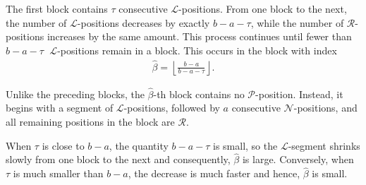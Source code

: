 \documentclass[oneside,reqno]{amsart}
\newcommand{\ts}{\mathcal{T}}
\newcommand{\lp}{\mathscr{L}}
\newcommand{\rp}{\mathscr{R}}
\newcommand{\np}{\mathscr{N}}
\newcommand{\pp}{\mathscr{P}}
\newcommand{\hbeta}{\widehat\beta}
\begin{document}
The first block contains $\tau$ consecutive $\lp$-positions. From one block to the next, the number of $\lp$-positions decreases by exactly $b-a-\tau$, while the number of $\rp$-positions increases by the same amount. %
This process continues until fewer than $b-a-\tau$  $\;\lp$-positions remain in a block. This occurs in the block with index
 \begin{align}
    \hbeta=\left \lfloor \frac{b-a}{b-a-\tau}\right\rfloor.\label{eq:betahat}
\end{align} 



 



Unlike the preceding blocks, the $\hbeta$-th block contains no $\pp$-position. Instead, it begins with a segment of $\lp$-positions, followed by $a$ consecutive $\np$-positions, and all remaining positions in the block are $\rp$.

When $\tau$ is close to $b-a$, the quantity $b-a-\tau$ is small, so the $\lp$-segment shrinks slowly from one block to the next and consequently, $\hbeta$ is large. Conversely, when $\tau$ is much smaller than $b-a$, the decrease is much faster and hence, $\hbeta$ is small.
\end{document}
